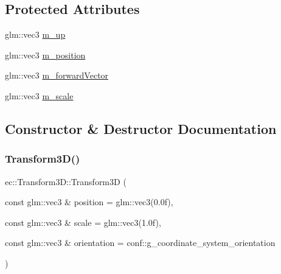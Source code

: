 \subsection*{Protected Attributes}
\begin{DoxyCompactItemize}
\item 
glm\+::vec3 \mbox{\hyperlink{classec_1_1_transform3_d_addd1132fb57befe841dfd9af94aa4329}{m\+\_\+up}}
\item 
glm\+::vec3 \mbox{\hyperlink{classec_1_1_transform3_d_a5bba8c29bb22d2b122b64b51b52335f7}{m\+\_\+position}}
\item 
glm\+::vec3 \mbox{\hyperlink{classec_1_1_transform3_d_a5d7ebb5dc842dc73fe0840f3e3f95ab8}{m\+\_\+forward\+Vector}}
\item 
glm\+::vec3 \mbox{\hyperlink{classec_1_1_transform3_d_a8eb8cecaa5ec8273e49c9487e0f6b935}{m\+\_\+scale}}
\end{DoxyCompactItemize}


\subsection{Constructor \& Destructor Documentation}
\mbox{\label{classec_1_1_transform3_d_aec13468ee4386a737b62c780086e9f95}} 
\subsubsection{\texorpdfstring{Transform3\+D()}{Transform3D()}}
{\footnotesize\ttfamily ec\+::\+Transform3\+D\+::\+Transform3D (\begin{DoxyParamCaption}\item[{const glm\+::vec3 \&}]{position = {\ttfamily glm\+:\+:vec3(0.0f)},  }\item[{const glm\+::vec3 \&}]{scale = {\ttfamily glm\+:\+:vec3(1.0f)},  }\item[{const glm\+::vec3 \&}]{orientation = {\ttfamily conf\+:\+:g\+\_\+coordinate\+\_\+system\+\_\+orientation} }\end{DoxyParamCaption})\hspace{0.3cm}{\ttfamily [explicit]}}

\mbox{\label{classec_1_1_transform3_d_a1df4b7afcf78aef64719b2302cfac864}} 
